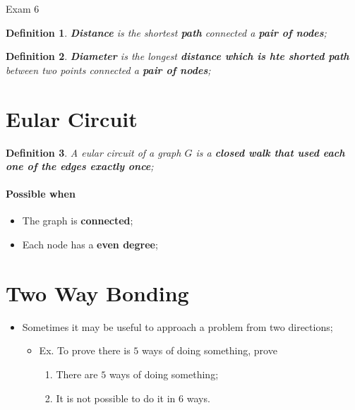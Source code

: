 \documentclass{note}
\newtheorem{definition}{Definition}
\begin{document}
\begin{note}{Exam 6}
        \begin{definition}
            \textbf{Distance} is the shortest \textbf{path} connected a \textbf{pair of nodes};
        \end{definition}

        \begin{definition}
            \textbf{Diameter} is the longest \textbf{distance which is hte shorted path} between two points connected a \textbf{pair of nodes};
        \end{definition}

        \section{Eular Circuit}

        \begin{definition}
            A eular circuit of a graph $ G $ is a \textbf{closed walk that used each one of the edges exactly once};
        \end{definition}

        \paragraph{Possible when}
        \begin{itemize}
            \item The graph is \textbf{connected};
            \item Each node has a \textbf{even degree};
        \end{itemize}

        \section{Two Way Bonding}

        \begin{itemize}
            \item Sometimes it may be useful to approach a problem from two directions;
            \begin{itemize}
                \item Ex. To prove there is $ 5 $ ways of doing something, prove
                \begin{enumerate}
                    \item There are $ 5 $ ways of doing something;
                    \item It is not possible to do it in $ 6 $ ways.
                \end{enumerate}


\end{itemize}
\end{itemize}
\end{note}
\end{document}
